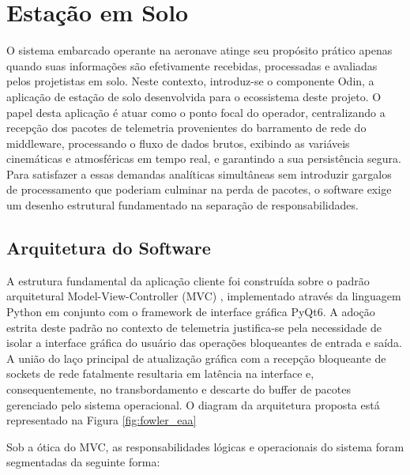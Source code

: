 \chapter{Estação em Solo}
\label{chap:client-em-campo}

O sistema embarcado operante na aeronave atinge seu propósito prático apenas quando suas informações são efetivamente recebidas, processadas e avaliadas pelos projetistas em solo. Neste contexto, introduz-se o componente Odin, a aplicação de estação de solo desenvolvida para o ecossistema deste projeto. O papel desta aplicação é atuar como o ponto focal do operador, centralizando a recepção dos pacotes de telemetria provenientes do barramento de rede do middleware, processando o fluxo de dados brutos, exibindo as variáveis cinemáticas e atmosféricas em tempo real, e garantindo a sua persistência segura. Para satisfazer a essas demandas analíticas simultâneas sem introduzir gargalos de processamento que poderiam culminar na perda de pacotes, o software exige um desenho estrutural fundamentado na separação de responsabilidades.

\section{Arquitetura do Software}

A estrutura fundamental da aplicação cliente foi construída sobre o padrão arquitetural Model-View-Controller (MVC) \cite{fowler_eaa}, implementado através da linguagem Python em conjunto com o framework de interface gráfica PyQt6. A adoção estrita deste padrão no contexto de telemetria justifica-se pela necessidade de isolar a interface gráfica do usuário das operações bloqueantes de entrada e saída. A união do laço principal de atualização gráfica com a recepção bloqueante de sockets de rede fatalmente resultaria em latência na interface e, consequentemente, no transbordamento e descarte do buffer de pacotes gerenciado pelo sistema operacional. O diagram da arquitetura proposta está representado na Figura \ref{fig:fowler_eaa}


Sob a ótica do MVC, as responsabilidades lógicas e operacionais do sistema foram segmentadas da seguinte forma:

